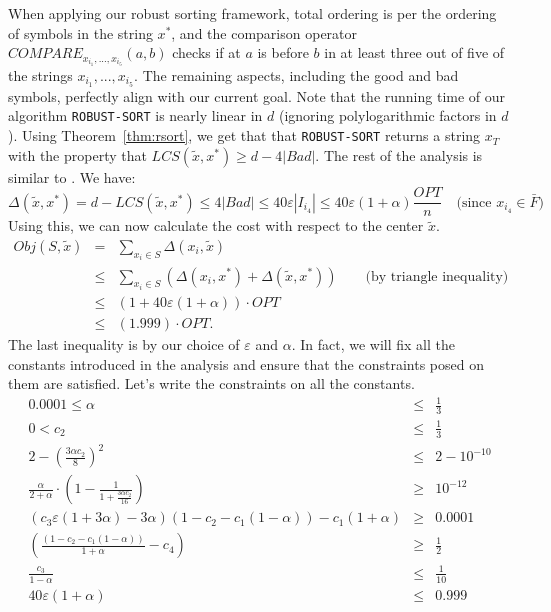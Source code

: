 \documentclass[11pt]{llncs}
\newcommand{\veps}{\varepsilon}
\begin{document}
When applying our robust sorting framework, total ordering is per the ordering of symbols in the string $x^*$, and the comparison operator {\tt $COMPARE_{x_{i_1}, ..., x_{i_5}}(a, b)$} checks if at $a$ is before $b$ in at least three out of five of the strings $x_{i_1}, ..., x_{i_5}$.
The remaining aspects, including the good and bad symbols, perfectly align with our current goal.
Note that the running time of our algorithm {\tt ROBUST-SORT} is nearly linear in $d$ (ignoring polylogarithmic factors in $d$). 
Using Theorem~\ref{thm:rsort}, we get that that {\tt ROBUST-SORT} returns a string $x_T$ with the property that $LCS(\tilde{x}, x^*) \geq d - 4|Bad|$.
The rest of the analysis is similar to \cite{cdk23}. We have:
$$
\Delta(\tilde{x}, x^*) = d - LCS(\tilde{x}, x^*) \leq 4 |Bad| \leq 40 \veps |I_{i_4}| \leq 40 \veps (1 + \alpha) \frac{OPT}{n} \quad \textrm{(since $x_{i_4} \in \bar{F}$)}
$$
Using this, we can now calculate the cost with respect to the center $\tilde{x}$.
\begin{eqnarray*}
Obj(S, \tilde{x}) &=& \sum_{x_i \in S} \Delta(x_i, \tilde{x}) \\
&\leq& \sum_{x_i \in S} \left( \Delta(x_i, x^*) + \Delta(\tilde{x}, x^*)\right) \qquad \textrm{(by triangle inequality)}\\
&\leq& \left( 1 + 40 \veps (1+\alpha)\right) \cdot OPT \\
&\leq& (1.999) \cdot OPT.
\end{eqnarray*}
The last inequality is by our choice of $\veps$ and $\alpha$. 
In fact, we will fix all the constants introduced in the analysis and ensure that the constraints posed on them are satisfied. Let's write the constraints on all the constants.
\begin{eqnarray*}
0.0001 \leq \alpha &\leq& \frac{1}{3} \\
0 < c_2 &\leq& \frac{1}{3} \\
 2 - \left(\frac{3\alpha c_2}{8}\right)^2 &\leq& 2 - 10^{-10}\\
\frac{\alpha}{2 + \alpha} \cdot \left( 1 - \frac{1}{1 + \frac{3\alpha c_2}{16}}\right) &\geq& 10^{-12}\\
 \left( c_3 \veps (1+3\alpha) - 3\alpha\right) (1 - c_2 - c_1(1-\alpha)) - c_1(1+\alpha) &\geq& 0.0001\\ 
\left(\frac{(1 - c_2 - c_1(1-\alpha))}{1+\alpha} - c_4 \right) &\geq& \frac{1}{2}\\
\frac{c_3}{1 - \alpha} &\leq& \frac{1}{10} \\
40 \veps (1+\alpha) &\leq& 0.999 \\
\end{eqnarray*}
\end{document}
